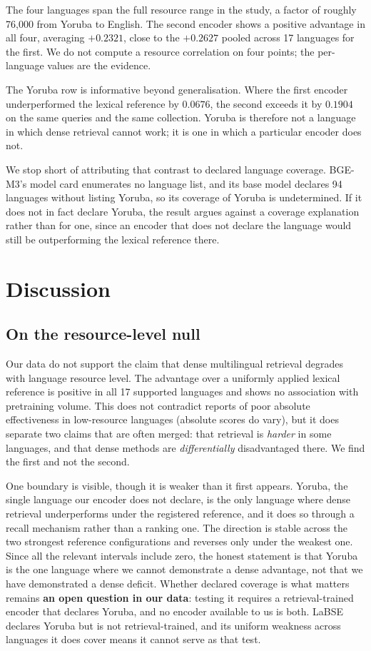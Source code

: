 \documentclass{ijimai_article}
\begin{document}
The four languages span the full resource range in the study, a factor of roughly
76{,}000 from Yoruba to English. The second encoder shows a positive advantage in all
four, averaging $+0.2321$, close to the $+0.2627$ pooled across 17 languages for the
first. We do not compute a resource correlation on four points; the per-language
values are the evidence.

The Yoruba row is informative beyond generalisation. Where the first encoder
underperformed the lexical reference by $0.0676$, the second exceeds it by $0.1904$ on
the same queries and the same collection. Yoruba is therefore not a language in which
dense retrieval cannot work; it is one in which a particular encoder does not.

We stop short of attributing that contrast to declared language coverage. BGE-M3's
model card enumerates no language list, and its base model declares 94 languages
without listing Yoruba, so its coverage of Yoruba is undetermined. If it does not in
fact declare Yoruba, the result argues against a coverage explanation rather than for
one, since an encoder that does not declare the language would still be outperforming
the lexical reference there.

\section{Discussion}

\subsection{On the resource-level null}
\label{sec:poolbias}
Our data do not support the claim that dense multilingual retrieval degrades with
language resource level. The advantage over a uniformly applied lexical reference
is positive in all 17 supported languages and shows no association with pretraining
volume. This does not contradict reports of poor absolute effectiveness in
low-resource languages (absolute scores do vary), but it does separate two claims
that are often merged: that retrieval is \emph{harder} in some languages, and that
dense methods are \emph{differentially} disadvantaged there. We find the first and
not the second.

One boundary is visible, though it is weaker than it first appears. Yoruba, the single
language our encoder does not declare, is the only language where dense retrieval
underperforms under the registered reference, and it does so through a recall mechanism
rather than a ranking one. The direction is stable across the two strongest
reference configurations and reverses only under the weakest one. Since all the relevant
intervals include zero, the honest statement is that Yoruba is the one language where we
cannot demonstrate a dense advantage, not that we have demonstrated a dense deficit.
Whether declared coverage is what matters remains \textbf{an open question in our data}: testing it requires a
retrieval-trained encoder that declares Yoruba, and no encoder available to us is
both. LaBSE declares Yoruba but is not retrieval-trained, and its uniform weakness
across languages it does cover means it cannot serve as that test.
\end{document}
